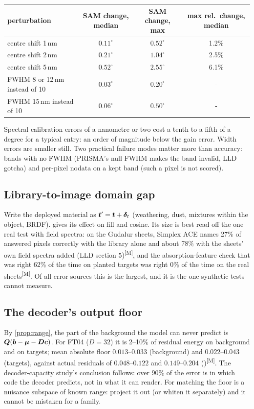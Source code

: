 \documentclass[11pt,a4paper]{article}
\theoremstyle{plain}
\theoremstyle{definition}
\theoremstyle{remark}
\newcommand{\bvec}{\B{b}}
\newcommand{\tv}{\B{t}}
\newcommand{\Dm}{\B{D}}
\newcommand{\meas}{\textsuperscript{\textsf{\scriptsize[M]}}}
\begin{document}
\begin{center}\small
\begin{tabular}{@{}lccc@{}}
\toprule
perturbation & SAM change, median & SAM change, max & max rel.\ change, median\\
\midrule
centre shift 1\,nm & $0.11^\circ$ & $0.52^\circ$ & 1.2\%\\
centre shift 2\,nm & $0.21^\circ$ & $1.04^\circ$ & 2.5\%\\
centre shift 5\,nm & $0.52^\circ$ & $2.55^\circ$ & 6.1\%\\
FWHM 8 or 12\,nm instead of 10 & $0.03^\circ$ & $0.20^\circ$ & -\\
FWHM 15\,nm instead of 10 & $0.06^\circ$ & $0.50^\circ$ & -\\
\bottomrule
\end{tabular}
\end{center}

Spectral calibration errors of a nanometre or two cost a tenth to a fifth of a degree for a typical entry: an order of magnitude
below the gain error. Width errors are smaller still. Two practical failure modes matter more than accuracy: bands with no FWHM
(PRISMA's null FWHM makes the band invalid, LLD gotcha) and per-pixel nodata on a kept band (such a pixel is not scored).

\subsection{Library-to-image domain gap}

Write the deployed material as $\tv'=\tv+\B\delta_t$ (weathering, dust, mixtures within the object, BRDF). 
gives its effect on fill and cosine. Its size is best read off the one real test with field spectra: on the Gudalur sheets,
Simplex ACE names 27\% of answered pixels correctly with the library alone and about 78\% with the sheets' own field spectra
added (LLD section 5)\meas, and the absorption-feature check that was right 62\% of the time on planted targets was right 0\% of
the time on the real sheets\meas. Of all error sources this is the largest, and it is the one synthetic tests cannot measure.

\subsection{The decoder's output floor}

By \cref{prop:range}, the part of the background the model can never predict is $\B Q(\bvec-\B\mu-\Dm\B c)$. For FT04 ($D=32$) it
is 2--10\% of residual energy on background and on targets; mean absolute floor $0.013$--$0.033$ (background) and $0.022$--$0.043$
(targets), against actual residuals of $0.048$--$0.122$ and $0.149$--$0.204$ ()\meas. The
decoder-capacity study's conclusion follows: over 90\% of the error is in which code the decoder predicts, not in what it can
render. For matching the floor is a nuisance subspace of known range: project it out (or whiten it separately) and it cannot be
mistaken for a family.
\end{document}
